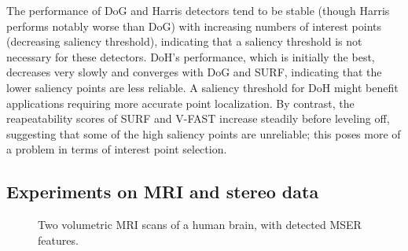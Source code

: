 The performance of DoG and Harris detectors tend to be stable (though Harris performs notably worse than DoG) with increasing numbers of interest points (\ie decreasing saliency threshold), indicating that a saliency threshold is not necessary for these detectors. DoH's performance, which is initially the best, decreases very slowly and converges with DoG and SURF, indicating that the lower saliency points are less reliable. A saliency threshold for DoH might benefit applications requiring more accurate point localization. By contrast, the reapeatability scores of SURF and V-FAST increase steadily before leveling off, suggesting that some of the high saliency points are unreliable; this poses more of a problem in terms of interest point selection. 

\subsection{Experiments on MRI and stereo data}

\begin{figure}[ht]
\vspace{-2mm}
\centering
{} 
\caption{Two volumetric MRI scans of a human brain, with detected MSER features.}
\label{fig:mri}
\vspace{-2mm}
\end{figure}

